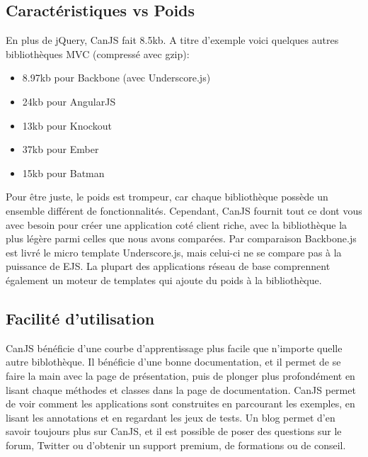 \subsection{Caractéristiques vs Poids}


En plus de jQuery, CanJS fait 8.5kb. A titre d’exemple voici quelques autres bibliothèques MVC (compressé avec gzip):

\begin{itemize}

	\item[\textbullet]
	8.97kb pour Backbone (avec Underscore.js)

	\item[\textbullet]
    24kb pour AngularJS

	\item[\textbullet] 
    13kb pour Knockout

	\item[\textbullet] 
    37kb pour Ember
    
    \item[\textbullet] 
    15kb pour Batman

\end{itemize}

Pour être juste, le poids est trompeur, car chaque bibliothèque possède un ensemble différent de fonctionnalités. Cependant, CanJS fournit tout ce dont vous avec besoin pour créer une application coté client riche, avec la bibliothèque la plus légère parmi celles que nous avons comparées.
Par comparaison Backbone.js est livré le micro template Underscore.js, mais celui-ci ne se compare pas à la puissance de EJS. La plupart des applications réseau de base comprennent également un moteur de templates qui ajoute du poids à la bibliothèque.

\subsection{Facilité d’utilisation}

CanJS bénéficie d’une courbe d’apprentissage plus facile que n’importe quelle autre biblothèque. Il bénéficie d’une bonne documentation, et il permet de se faire la main avec la page de présentation, puis de plonger plus profondément en lisant chaque méthodes et classes dans la page de documentation. CanJS permet de voir comment les applications sont construites en parcourant les exemples, en lisant les annotations et en regardant les jeux de tests. Un blog permet d’en savoir toujours plus sur CanJS, et il est possible de poser des questions sur le forum, Twitter ou d’obtenir un support premium, de formations ou de conseil.

